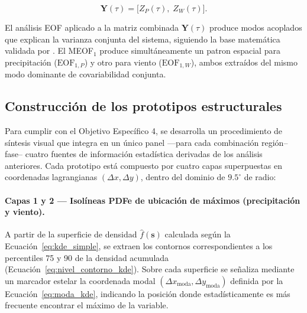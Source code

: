 \begin{equation}\label{eq:meof_vector}
    \mathbf{Y}(\tau) = \big[ Z_P(\tau),\; Z_W(\tau) \big].
\end{equation}
 
El análisis EOF aplicado a la matriz combinada $\mathbf{Y}(\tau)$ produce modos acoplados que explican la varianza conjunta del sistema, siguiendo la base matemática validada por \citet{liang2018multivariate}. El MEOF$_1$ produce simultáneamente un patron espacial para precipitación ($\text{EOF}_{1,P}$) y otro para viento ($\text{EOF}_{1,W}$), ambos extraídos del mismo modo dominante de covariabilidad conjunta.
 
\subsection{Construcción de los prototipos estructurales}\label{subsec:prototipos}
 
Para cumplir con el Objetivo Específico 4, se desarrolla un procedimiento de síntesis visual que integra en un único panel —para cada combinación región--fase-- cuatro fuentes de información estadística derivadas de los análisis anteriores. Cada prototipo está compuesto por cuatro capas superpuestas en coordenadas lagrangianas $(\Delta x, \Delta y)$, dentro del dominio de $9.5^{\circ}$ de radio:
 
\paragraph{Capas 1 y 2 — Isolíneas PDFe de ubicación de máximos (precipitación y viento).}
A partir de la superficie de densidad $\hat{f}(\mathbf{s})$ calculada según la Ecuación~\ref{eq:kde_simple}, se extraen los contornos correspondientes a los percentiles 75 y 90 de la densidad acumulada (Ecuación~\ref{eq:nivel_contorno_kde}). Sobre cada superficie se señaliza mediante un marcador estelar la coordenada modal $(\Delta x_{\text{moda}}, \Delta y_{\text{moda}})$ definida por la Ecuación~\ref{eq:moda_kde}, indicando la posición donde estadísticamente es más frecuente encontrar el máximo de la variable.
 
